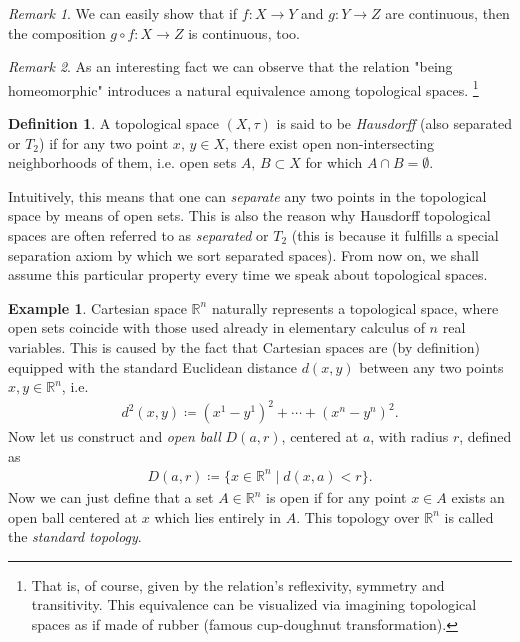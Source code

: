 \documentclass[a4paper,11pt]{article}
\theoremstyle{theorem}
\theoremstyle{remark}
\newtheorem*{remark}{Remark}
\theoremstyle{definition}
\newtheorem{definition}{Definition}
\newtheorem*{example}{Example}
\begin{document}
		\begin{remark}
			We can easily show that if $f: X \to Y$ and $g: Y \to Z$ are continuous, then the composition $g \circ f: X \to Z$ is continuous, too.
		\end{remark}
	
		\begin{remark}
			As an interesting fact we can observe that the relation "being homeomorphic" introduces a natural equivalence among topological spaces.%
				\footnote{That is, of course, given by the relation's reflexivity, symmetry and transitivity. This equivalence can be visualized via imagining topological spaces as if made of rubber (famous cup-doughnut transformation).}
		\end{remark}
		
		\begin{definition}
			A topological space $(X,\tau)$ is said to be \emph{Hausdorff} (also separated or $T_2$) if for any two point $x, \, y \in X$, there exist open non-intersecting neighborhoods of them, i.e. open sets $A, \, B \subset X$ for which $A \cap B = \emptyset$.
		\end{definition}
		Intuitively, this means that one can \emph{separate} any two points in the topological space by means of open sets. This is also the reason why Hausdorff topological spaces are often referred to as \emph{separated} or $T_2$ (this is because it fulfills a special separation axiom by which we sort separated spaces). From now on, we shall assume this particular property every time we speak about topological spaces.
		
		\begin{example}
			Cartesian space $\mathbb R^n$ naturally represents a topological space, where open sets coincide with those used already in elementary calculus of $n$ real variables. This is caused by the fact that Cartesian spaces are (by definition) equipped with the standard Euclidean distance $d(x,y)$ between any two points $x,y \in \mathbb R^n$, i.e.
			\begin{align*}
				d^2(x,y) \coloneqq (x^1-y^1)^2 + \cdots + (x^n-y^n)^2.
			\end{align*}
			Now let us construct and \emph{open ball} $D(a,r)$, centered at $a$, with radius $r$, defined as
			\begin{align*}
				D(a,r) \coloneqq \{x \in \mathbb R^n \mid d(x,a) < r\}.
			\end{align*}
			Now we can just define that a set $A \in \mathbb R^n$ is open if for any point $x \in A$ exists an open ball centered at $x$ which lies entirely in $A$. This topology over $\mathbb R^n$ is called the \emph{standard topology}.
		\end{example}
		
\end{document}
